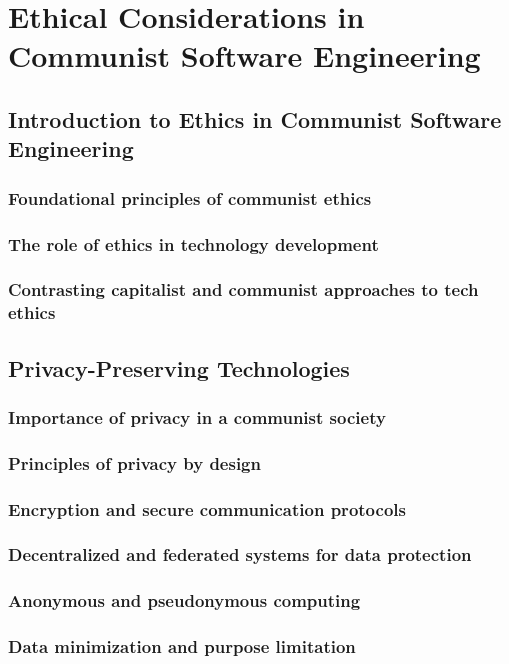 \chapter{Ethical Considerations in Communist Software Engineering}

\section{Introduction to Ethics in Communist Software Engineering}
\subsection{Foundational principles of communist ethics}
\subsection{The role of ethics in technology development}
\subsection{Contrasting capitalist and communist approaches to tech ethics}

\newpage

\section{Privacy-Preserving Technologies}
\subsection{Importance of privacy in a communist society}
\subsection{Principles of privacy by design}
\subsection{Encryption and secure communication protocols}
\subsection{Decentralized and federated systems for data protection}
\subsection{Anonymous and pseudonymous computing}
\subsection{Data minimization and purpose limitation}
